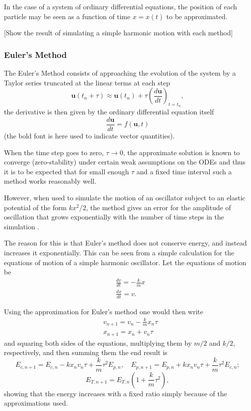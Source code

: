 In the case of a system of ordinary differential equations, the position of each particle may be seen as a function of time $ x=x(t) $ to be approximated.

[Show the result of simulating a simple harmonic motion with each method]

\subsubsection{Euler's Method} 

The Euler's Method consists of approaching the evolution of the system by a Taylor series truncated at the linear terms at each step
$$\mathbf{u}(t_n+\tau) \approx \mathbf{u}(t_n) + \tau\left( \frac{d\mathbf{u}}{dt}\right)_{t=t_n},$$
the derivative is then given by the ordinary differential equation itself
$$\frac{d\mathbf{u}}{dt} = f(\mathbf{u},t)$$
(the bold font is here used to indicate vector quantities).


When the time step goes to zero, $ \tau\to 0 $, the approximate solution is known to converge (zero-stability) under certain weak assumptions on the ODEs \cite{quarteroniNumericalMathematics2007} and thus it is to be expected that for small enough $ \tau $ and a fixed time interval such a method works reasonably well. 

However, when used to simulate the motion of an oscillator subject to an elastic potential of the form $k x^2/2$, the method gives an error for the amplitude of oscillation that grows exponentially with the number of time steps in the simulation \cite{giordanoComputationalPhysics1997}.

The reason for this is that Euler's method does not conserve energy, and instead increases it exponentially. This can be seen from a simple calculation for the equations of motion of a simple harmonic oscillator. Let the equations of motion be
\begin{equation*} \label{eq:2}
\begin{aligned}
&\frac{dv}{dt} = -\frac{k}{m}x\\
&\frac{dx}{dt}=v.
\end{aligned}
\end{equation*}

Using the approximation for Euler's method one would then write
\begin{equation*}
\begin{aligned}
&v_{n+1} = v_n -\frac{k}{m}x_n \tau\\
&x_{n+1} = x_n + v_n \tau
\end{aligned}
\end{equation*}
and squaring both sides of the equations, multiplying them by $m/2$ and $k/2$, respectively, and then summing them the end result is
$$
E_{c,n+1} = E_{c,n} -k x_n v_n \tau + \frac{k}{m} \tau^2 E_{p,n}, \quad
E_{p,n+1} = E_{p,n} + k x_n v_n \tau + \frac{k}{m} \tau^2 E_{c,n};
$$
\begin{equation*}
E_{T, n+1} = E_{T,n}\left(1 + \frac{k}{m}\tau^2\right),
\end{equation*}
showing that the energy increases with a fixed ratio simply because of the approximations used.

